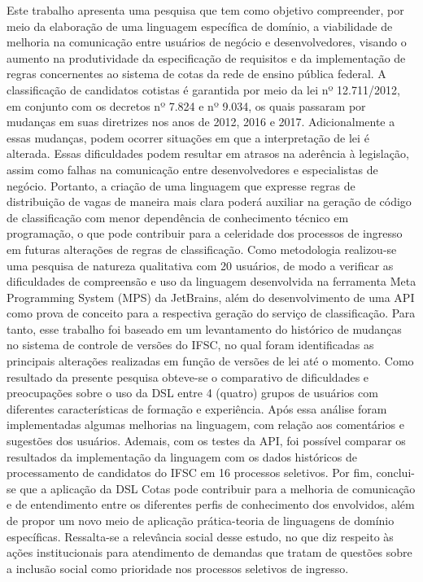 
\begin{resumo}[Resumo] 
Este trabalho apresenta uma pesquisa que tem como objetivo compreender, por meio da elaboração de uma linguagem específica de domínio, a viabilidade de melhoria na comunicação entre usuários de negócio e desenvolvedores, visando o aumento na produtividade da especificação de requisitos e da implementação de regras concernentes ao sistema de cotas da rede de ensino pública federal. A classificação de candidatos cotistas é garantida por meio da lei nº 12.711/2012, em conjunto com os decretos nº 7.824 e nº 9.034, os quais passaram por mudanças em suas diretrizes nos anos de 2012, 2016 e 2017. Adicionalmente a essas mudanças, podem ocorrer situações em que a interpretação de lei é alterada. Essas dificuldades podem resultar em atrasos na aderência à legislação, assim como falhas na comunicação entre desenvolvedores e especialistas de negócio. Portanto, a criação de uma linguagem que expresse regras de distribuição de vagas de maneira mais clara poderá auxiliar na geração de código de classificação com menor dependência de conhecimento técnico em programação, o que pode contribuir para a celeridade dos processos de ingresso em futuras alterações de regras de classificação. Como metodologia realizou-se uma pesquisa de natureza qualitativa com 20 usuários, de modo a verificar as dificuldades de compreensão e uso da linguagem desenvolvida na ferramenta Meta Programming System (MPS) da JetBrains, além do desenvolvimento de uma \gls{API} como prova de conceito para a respectiva geração do serviço de classificação. Para tanto, esse trabalho foi baseado em um levantamento do histórico de mudanças no sistema de controle de versões do \gls{IFSC}, no qual foram identificadas as principais alterações realizadas em função de versões de lei até o momento. Como resultado da presente pesquisa obteve-se o comparativo de dificuldades e preocupações sobre o uso da DSL entre 4 (quatro) grupos de usuários com diferentes características de formação e experiência. Após essa análise foram implementadas algumas melhorias na linguagem, com relação aos comentários e sugestões dos usuários. Ademais, com os testes da \gls{API}, foi possível comparar os resultados da implementação da linguagem com os dados históricos de processamento de candidatos do IFSC em 16 processos seletivos. Por fim, conclui-se que a aplicação da DSL Cotas pode contribuir para a melhoria de comunicação e de entendimento entre os diferentes perfis de conhecimento dos envolvidos, além de propor um novo meio de aplicação prática-teoria de linguagens de domínio específicas. Ressalta-se a relevância social desse estudo, no que diz respeito às ações institucionais para atendimento de demandas que tratam de questões sobre a inclusão social como prioridade nos processos seletivos de ingresso.


\end{resumo}
